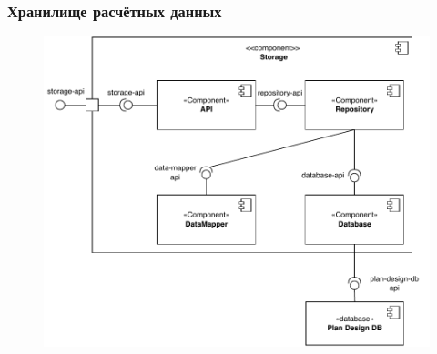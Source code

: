 \begin{frame}
\frametitle{Хранилище расчётных данных}
\begin{figure}
    \includegraphics[scale=.55]{pictures/architecture/storage_component_common}
\end{figure}
\end{frame}
